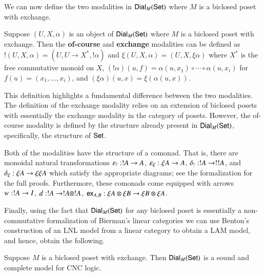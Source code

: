 We can now define the two modalities in $\mathsf{Dial}_{M}(\mathsf{Set})$ where $M$ is
a biclosed poset with exchange.
\begin{definition}
  \label{def:modalities-dial}
  Suppose $(U, X, \alpha)$ is an object of $\mathsf{Dial}_{M}(\mathsf{Set})$ where $M$
  is a biclosed poset with exchange. Then the \textbf{of-course} and
  \textbf{exchange} modalities can be defined as 
  $! (U, X, \alpha) = (U, U \to X^*, !\alpha)$ and
  $\xi (U, X, \alpha) = (U, X, \xi \alpha)$
  where $X^*$ is the free commutative monoid on $X$, $(!\alpha)(u, f)
  = \alpha(u, x_1) \circ \cdots \circ \alpha(u, x_i)$ for $f(u) =
  (x_1, \ldots, x_i)$, and $(\xi \alpha)(u, x) = \xi (\alpha(u,
  x))$.
\end{definition}
This definition highlights a fundamental difference between the two
modalities.  The definition of the exchange modality relies on an
extension of biclosed posets with essentially the exchange modality in
the category of posets.  However, the of-course modality is defined by
the structure already present in $\mathsf{Dial}_{M}(\mathsf{Set})$, specifically, the
structure of $\mathsf{Set}$.

Both of the modalities have the structure of a comonad.  That is,
there are monoidal natural transformations $\varepsilon_! : !A \rightarrow
A$, $\varepsilon_\xi : \xi A \rightarrow A$, $\delta_! : !A \rightarrow !!A$,
and $\delta_\xi : \xi A \rightarrow \xi\xi A$ which satisfy the
appropriate diagrams; see the formalization for the full
proofs. Furthermore, these comonads come equipped with arrows $w : !A
\rightarrow I$, $d : !A \rightarrow !A \otimes !A$, $\mathsf{ex}_{A,B} : \xi A \otimes \xi B \rightarrow \xi B
\otimes \xi A$. 

Finally, using the fact that $\mathsf{Dial}_{M}(\mathsf{Set})$ for any biclosed poset
is essentially a non-commutative formalization of Bierman's linear
categories \cite{Bierman:1994} we can use Benton's construction of an
LNL model from a linear category to obtain a LAM model, and hence,
obtain the following.
\begin{theorem}
  \label{theorem:sound-dial-exchange-!}
  Suppose $M$ is a biclosed poset with exchange.  Then
  $\mathsf{Dial}_{M}(\mathsf{Set})$ is a sound and complete model for CNC logic.
\end{theorem}

